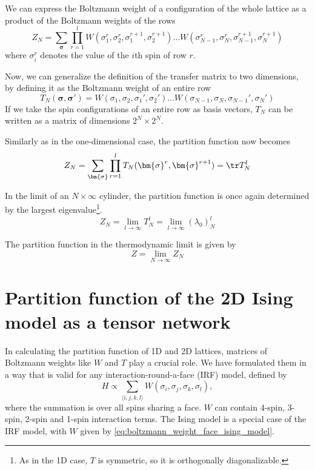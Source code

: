 We can express the Boltzmann weight of a configuration of the whole lattice as
a product of the Boltzmann weights of the rows
\begin{equation}
  Z_N = \sum_{\bm{\sigma}} \prod_{r = 1}^{l} W(\sigma_{1}^{r}, \sigma_{2}^{r}, \sigma_{1}^{r+1}, \sigma_{2}^{r+1}) \dots W(\sigma_{N-1}^{r}, \sigma_{N}^{r}, \sigma_{N-1}^{r+1}, \sigma_{N}^{r+1})
\end{equation}
where $\sigma_{i}^{r}$ denotes the value of the $i$th spin of row $r$.

Now, we can generalize the definition of the transfer matrix to two dimensions, by
defining it as the Boltzmann weight of an entire row
\begin{equation}\label{eq:row_to_row_transfer_matrix}
  T_{N}(\bm{\sigma}, \bm{\sigma'}) = W(\sigma_1, \sigma_2, \sigma_1', \sigma_2') \dots W(\sigma_{N-1}, \sigma_N, \sigma_{N-1}', \sigma_{N}')
\end{equation}
If we take the spin configurations of an entire row as basis vectors, $T_N$ can be written
as a matrix of dimensions $2^N \times 2^N$.

Similarly as in the one-dimensional case, the partition function now becomes
\begin{equation}\label{eq:z_n_times_infty}
  Z_N = \sum_{\bm{\sigma}} \prod_{r = 1}^{l} T_{N}(\bm{\sigma}^r, \bm{\sigma}^{r+1}) = \tr T_{N}^l
\end{equation}

In the limit of an $N \times \infty$ cylinder, the partition function is once again
determined by the largest eigenvalue\footnote{As in the 1D case, $T$ is symmetric, so it
is orthogonally diagonalizable.}.
\begin{equation}\label{largest_eigenvalue_transfer_matrix}
  Z_N = \lim_{l \to \infty} T_{N}^{l} = \lim_{l \to \infty} (\lambda_0)_{N}^{l}
\end{equation}

The partition function in the thermodynamic limit is given by
\begin{equation}
  Z = \lim_{N \to \infty} Z_N
\end{equation}

\section{Partition function of the 2D Ising model as a tensor network}
In calculating the partition function of 1D and 2D lattices, matrices of Boltzmann weights
like $W$ and $T$ play a crucial role. We have formulated them in a way that is valid for
any interaction-round-a-face (IRF) model, defined by
\begin{equation}
  H \propto \sum_{\langle i, j, k, l \rangle} W(\sigma_i, \sigma_j, \sigma_k,
  \sigma_l),
\end{equation}
where the summation is over all spins sharing a face. $W$ can contain 4-spin,
3-spin, 2-spin and 1-spin interaction terms. The Ising model is a special case of the IRF
model, with $W$ given by \autoref{eq:boltzmann_weight_face_ising_model}.

